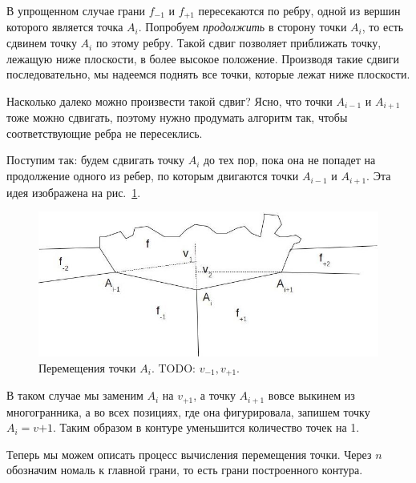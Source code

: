 \documentclass[a4paper,12pt, titlepage]{article}
\begin{document}
\begin{flushleft}
  В упрощенном случае грани $f_{-1}$ и $f_{+1}$ пересекаются по ребру, одной из вершин которого является
точка $A_{i}$. Попробуем \textit{продолжить} в сторону точки $A_{i}$, то есть сдвинем точку $A_{i}$ 
по этому ребру. Такой сдвиг позволяет приближать точку, лежащую ниже плоскости, в более высокое 
положение. Производя такие сдвиги последовательно, мы надеемся поднять все точки, которые лежат ниже 
плоскости.
\end{flushleft}
\begin{flushleft}
  Насколько далеко можно произвести такой сдвиг? Ясно, что точки $A_{i - 1}$ и $A_{i + 1}$ тоже можно
сдвигать, поэтому нужно продумать алгоритм так, чтобы соответствующие ребра не пересеклись.
\end{flushleft}
\begin{flushleft}
  Поступим так: будем сдвигать точку $A_{i}$ до тех пор, пока она не попадет на продолжение одного из 
ребер, по которым двигаются точки $A_{i - 1}$ и $A_{i + 1}$. Эта идея изображена на рис.~\ref{pic-step-3}.
\end{flushleft}
\begin{flushleft}
  \begin{figure}[h]
    \includegraphics[clip, width=13cm]{img/pic-step-3.jpg}
    \caption{Перемещения точки $A_{i}$. TODO: $v_{-1}, v_{+1}$.}\label{pic-step-3}
  \end{figure}
\end{flushleft}
\begin{flushleft}
  В таком случае мы заменим $A_{i}$ на $v_{+1}$, а точку $A_{i + 1}$ вовсе выкинем из многогранника, а во
всех позициях, где она фигурировала, запишем точку $A_{i} = v{+1}$. Таким образом в контуре уменьшится
количество точек на 1.
\end{flushleft}
\begin{flushleft}
 Теперь мы можем описать процесс вычисления перемещения точки. Через $n$ обозначим номаль к главной грани,
то есть грани построенного контура.
\end{flushleft}
\end{document}
